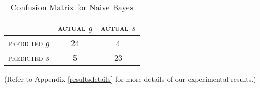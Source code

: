 \begin{table}[h]
	\center
	\begin{tabular}{ c | c  c }
		 & \textsc{actual $g$} & \textsc{actual $s$} \\
		\hline
		\textsc{predicted $g$} 	& 24 & 4 \\
		\textsc{predicted $s$}		& 5 & 23
	\end{tabular}
	\caption{Confusion Matrix for Naive Bayes}
	\label{tab:naivebayesconfusionmatrix}
\end{table}

(Refer to Appendix \ref{resultsdetails} for more details of our experimental results.)
